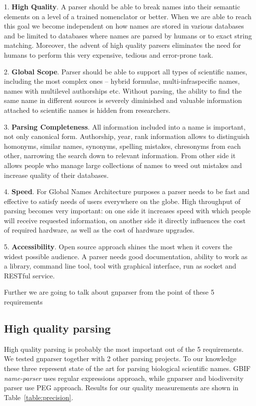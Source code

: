 \documentclass{bmcart}
\begin{document}
1. \textbf{High Quality}. A parser should be able to break names into their
semantic elements on a level of a trained nomenclator or better. When we are
able to reach this goal we become independent on how names are stored in
various databases and be limited to databases where names are parsed by humans
or to exact string matching. Moreover, the advent of high quality parsers
eliminates the need for humans to perform this very expensive, tedious and
error-prone task.


2. \textbf{Global Scope}. Parser should be able to support all types of
scientific names, including the most complex ones -- hybrid formulae,
multi-infraspecific names, names with multilevel authorships etc. Without
parsing, the ability to find the same name in different sources is severely
diminished and valuable information attached to scientific names is hidden
from researchers.

3. \textbf{Parsing Completeness}. All information included into a name is
important, not only canonical form. Authorship, year, rank information allows
to distinguish homonyms, similar names, synonyms, spelling mistakes,
chresonyms from each other, narrowing the search down to relevant information.
From other side it allows people who manage large collections of names to weed
out mistakes and increase quality of their databases.

4. \textbf{Speed}. For Global Names Architecture purposes a parser needs to be
fast and effective to satisfy needs of users everywhere on the globe.  High
throughput of parsing becomes very important: on one side it increases speed
with which people will receive requested information, on another side it
directly influences the cost of required hardware, as well as the cost of
hardware upgrades.

5. \textbf{Accessibility}. Open source approach shines the most when it covers
the widest possible audience. A parser needs good documentation, ability to
work as a library, command line tool, tool with graphical interface, run as
socket and RESTful service.

Further we are going to talk about gnparser from the point of these 5
requirements

\subsection*{High quality parsing}

High quality parsing is probably the most important out of the 5 requirements.
We tested gnparser together with 2 other parsing projects. To our knowledge
these three represent state of the art for parsing biological scientific names.
GBIF \textit{name-parser} uses regular expressions approach, while gnparser and
biodiversity parser use PEG approach. Results for our quality measurements are
shown in Table~\ref{table:precision}.
\end{document}
